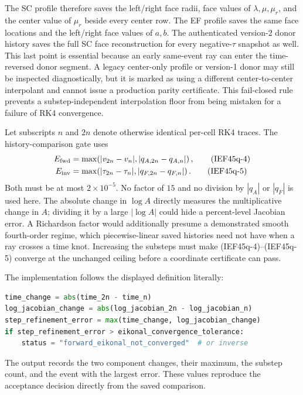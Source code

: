 The SC profile therefore saves the left/right face radii, face values of
\(\lambda,\mu,\mu_r\), and the center value of \(\mu_r\) beside every center
row.  The EF profile saves the same face locations and the left/right face
values of \(a,b\).  The authenticated  version-2 donor
history saves the full SC face reconstruction for every negative-\(\tau\)
snapshot as well.  This last point is essential because an early same-event
ray can enter the time-reversed donor segment.  A legacy center-only profile
or version-1 donor may still be inspected diagnostically, but it is marked as
using a different center-to-center interpolant and cannot issue a production
parity certificate.  This fail-closed rule prevents a substep-independent
interpolation floor from being mistaken for a failure of RK4 convergence.

Let subscripts \(n\) and \(2n\) denote otherwise identical per-cell RK4
traces.  The history-comparison gate uses
\begin{align}
 E_{\rm fwd}
 &=\max\!\left(
      |v_{2n}-v_n|,
      |q_{A,2n}-q_{A,n}|
    \right),                                           \tag{IEF45q-4}\\
 E_{\rm inv}
 &=\max\!\left(
      |\tau_{2n}-\tau_n|,
      |q_{F,2n}-q_{F,n}|
    \right).                                           \tag{IEF45q-5}
\end{align}
Both must be at most \(2\times10^{-5}\).  No factor of \(15\) and no division
by \(|q_A|\) or \(|q_F|\) is used here.  The absolute change in \(\log A\)
directly measures the multiplicative change in \(A\); dividing it by a large
\(|\log A|\) could hide a percent-level Jacobian error.  A Richardson factor
would additionally presume a demonstrated smooth fourth-order regime, which
piecewise-linear saved histories need not have when a ray crosses a time
knot.  Increasing the substeps must make (IEF45q-4)--(IEF45q-5) converge at
the unchanged ceiling before a coordinate certificate can pass.

The implementation follows the displayed definition literally:
\begin{lstlisting}[language=Python,basicstyle=\ttfamily\scriptsize]
time_change = abs(time_2n - time_n)
log_jacobian_change = abs(log_jacobian_2n - log_jacobian_n)
step_refinement_error = max(time_change, log_jacobian_change)
if step_refinement_error > eikonal_convergence_tolerance:
    status = "forward_eikonal_not_converged"  # or inverse
\end{lstlisting}
The output records the two component changes, their maximum, the substep
count, and the event with the largest error.  These values reproduce the
acceptance decision directly from the saved comparison.

